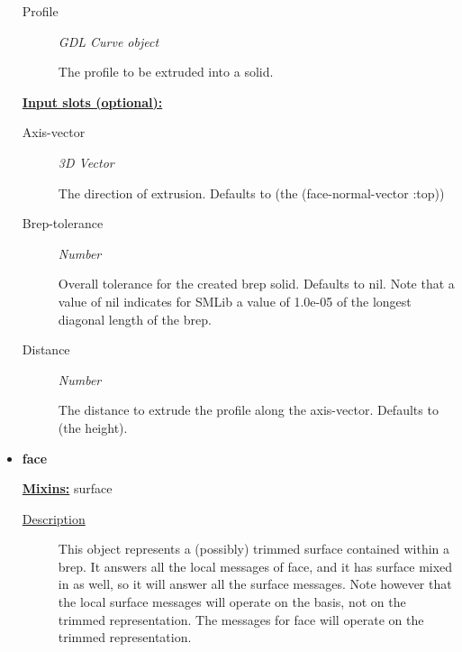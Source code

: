 \documentclass [11pt]{book}
\begin{document}
\begin{itemize}
\begin{description}
\item [Profile]
\emph{GDL Curve object}

 The profile to be extruded into a solid.




\end{description}






\textbf{
\underline{Input slots (optional):}}

\begin{description}

\item [Axis-vector]
\emph{3D Vector}

 The direction of extrusion. Defaults
to (the (face-normal-vector :top))




\item [Brep-tolerance]
\emph{Number}

 Overall tolerance for the created brep solid. Defaults to nil.
Note that a value of nil indicates for SMLib a value of 1.0e-05 of the longest diagonal
length of the brep.




\item [Distance]
\emph{Number}

 The distance to extrude the profile along the axis-vector.
Defaults to (the height).




\end{description}







\item {}
\label{prim:face}
\textbf{face}


\textbf{
\underline{Mixins:}} surface





\begin{description}

\item [
\underline{Description}]


This object represents a (possibly) trimmed surface contained within a brep. It answers
all the local messages of face, and it has surface mixed in as well, so it will answer all the surface messages. Note 
however that the local surface messages will operate on the basis, not on the trimmed representation. The messages 
for face will operate on the trimmed representation.


\end{description}
\end{itemize}
\end{document}
